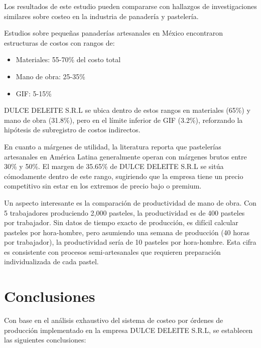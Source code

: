 \documentclass[
  stu,
  floatsintext,
  longtable,
  a4paper,
  nolmodern,
  notxfonts,
  notimes,
  12pt,
  colorlinks=true,linkcolor=blue,citecolor=blue,urlcolor=blue]{apa7}
\providecommand{\tightlist}{%
  \setlength{\itemsep}{0pt}\setlength{\parskip}{0pt}}
\begin{document}
Los resultados de este estudio pueden compararse con hallazgos de
investigaciones similares sobre costeo en la industria de panadería y
pastelería.

Estudios sobre pequeñas panaderías artesanales en México encontraron
estructuras de costos con rangos de:

\begin{itemize}
\tightlist
\item
  Materiales: 55-70\% del costo total
\item
  Mano de obra: 25-35\%
\item
  GIF: 5-15\%
\end{itemize}

DULCE DELEITE S.R.L se ubica dentro de estos rangos en materiales (65\%)
y mano de obra (31.8\%), pero en el límite inferior de GIF (3.2\%),
reforzando la hipótesis de subregistro de costos indirectos.

En cuanto a márgenes de utilidad, la literatura reporta que pastelerías
artesanales en América Latina generalmente operan con márgenes brutos
entre 30\% y 50\%. El margen de 35.65\% de DULCE DELEITE S.R.L se sitúa
cómodamente dentro de este rango, sugiriendo que la empresa tiene un
precio competitivo sin estar en los extremos de precio bajo o premium.

Un aspecto interesante es la comparación de productividad de mano de
obra. Con 5 trabajadores produciendo 2,000 pasteles, la productividad es
de 400 pasteles por trabajador. Sin datos de tiempo exacto de
producción, es difícil calcular pasteles por hora-hombre, pero asumiendo
una semana de producción (40 horas por trabajador), la productividad
sería de 10 pasteles por hora-hombre. Esta cifra es consistente con
procesos semi-artesanales que requieren preparación individualizada de
cada pastel.

\section{Conclusiones}\label{conclusiones}

Con base en el análisis exhaustivo del sistema de costeo por órdenes de
producción implementado en la empresa DULCE DELEITE S.R.L, se establecen
las siguientes conclusiones:
\end{document}
